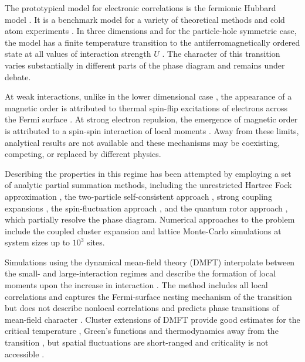 \documentclass[aps,prb,twocolumn,amsmath,notitlepage,floatfix,footinbib,superscriptaddress,showpacs, showkeys]{revtex4-1}
\begin{document}
The prototypical model for electronic correlations is the fermionic Hubbard model \cite{Hubbard:1963,Gutzwiller1963}. 
It is a benchmark model for a variety of theoretical methods \cite{LeBlanc2015a} and cold atom experiments \cite{Esslinger2010,Hart2014,Jotzu2015}. 
In three dimensions and for the particle-hole symmetric case, the model has a finite temperature transition to the antiferromagnetically ordered state at all values of interaction strength $U$ \cite{Hirsch1987}. 
The character of this transition varies substantially in different parts of the phase diagram \cite{Moriya1984,Pruschke2003} and remains under debate.  

At weak interactions, unlike in the lower dimensional case \cite{Moukouri2001}, the appearance of a magnetic order is attributed to thermal spin-flip excitations of electrons across the Fermi surface \cite{Moriya1984}. 
At strong electron repulsion, the emergence of magnetic order is attributed to a spin-spin interaction of local moments \cite{Cyrot1970, Anderson1978}.
Away from these limits, analytical results are not available and these mechanisms may be coexisting, competing, or replaced by different physics.

Describing the properties in this regime has been attempted by employing a set of analytic partial summation methods, including the unrestricted Hartree Fock approximation \cite{VanDongen1991}, the two-particle self-consistent approach \cite{Dare1996,Dare1999}, strong coupling expansions \cite{Logan1996,Szczech1995}, the spin-fluctuation approach \cite{Singh1998}, and the quantum rotor approach \cite{Zaleski2008}, which partially resolve the phase diagram. 
Numerical approaches to the problem include the coupled cluster expansion \cite{Pan1997} and lattice Monte-Carlo simulations \cite{Hirsch1987,Scalettar1989,Staudt2000,Campos2004,Paiva2011, Kozik2013} at system sizes up to $10^3$ sites.

Simulations using the dynamical mean-field theory (DMFT)  \cite{Metzner1989,Georges1992,Georges1996,Kotliar2006} interpolate between the small- and large-interaction regimes and describe the formation of local moments upon the increase in interaction \cite{Ulmke1997,Pruschke2003}. 
The method includes all local correlations \cite{Metzner1989,Metzner:1991} and captures the Fermi-surface nesting mechanism of the transition \cite{Ulmke1997} but does not describe nonlocal correlations and predicts phase transitions of mean-field character \cite{Byczuk2002a,Freericks2003}. 
Cluster extensions of DMFT \cite{Lichtenstein2000, KotliarSavrasov:2001, Maier2005, Kent2005} provide good estimates for the critical temperature \cite{Kent2005}, Green's functions \cite{FuchsGull:2011} and thermodynamics away from the transition \cite{Fuchs2011b}, but spatial fluctuations are short-ranged and criticality is not accessible \cite{Maier2005}. 
\end{document}

